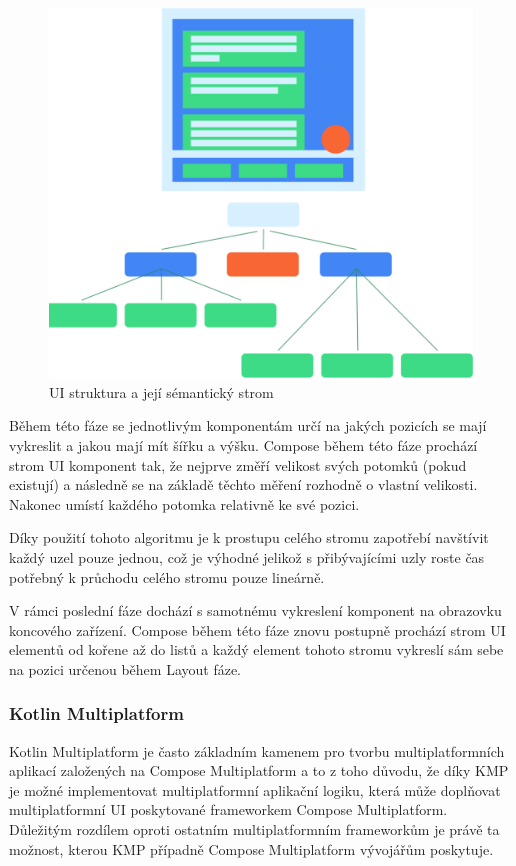 \begin{figure}[H]
  \centering
  \includegraphics[width=.5\textwidth]{semantics-ui-tree.png}
  \caption{UI struktura a její sémantický strom}
  \label{fig:semantics-ui-tree}
\end{figure}

Během této fáze se jednotlivým komponentám určí na jakých pozicích se mají vykreslit a jakou mají mít šířku a výšku.
Compose během této fáze prochází strom UI komponent tak, že nejprve změří velikost svých potomků (pokud existují) a následně se 
na základě těchto měření rozhodně o vlastní velikosti. Nakonec umístí každého potomka relativně ke své pozici.\cite{jetpackPhases}

Díky použití tohoto algoritmu je k prostupu celého stromu zapotřebí navštívit každý uzel pouze jednou, což je výhodné jelikož
s přibývajícími uzly roste čas potřebný k průchodu celého stromu pouze lineárně. \cite{jetpackPhases}

V rámci poslední fáze dochází s samotnému vykreslení komponent na obrazovku koncového zařízení. \cite{jetpackPhases}
Compose během této fáze znovu postupně prochází strom UI elementů od kořene až do listů a každý element tohoto stromu vykreslí sám sebe 
na pozici určenou během Layout fáze. \cite{jetpackPhases}

\subsubsection{Kotlin Multiplatform} \label{kmpSection}



Kotlin Multiplatform je často základním kamenem pro tvorbu multiplatformních aplikací založených na Compose Multiplatform a to
z toho důvodu, že díky KMP je možné implementovat multiplatformní aplikační logiku, která může doplňovat multiplatformní UI 
poskytované frameworkem Compose Multiplatform. \cite{KMPUseCases} Důležitým rozdílem oproti ostatním multiplatformním frameworkům 
je právě ta možnost, kterou KMP případně Compose Multiplatform vývojářům poskytuje. 

